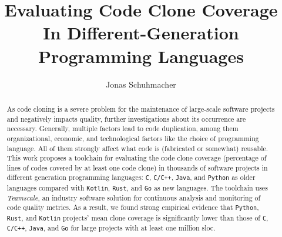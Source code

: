 \documentclass[runningheads]{llncs}
\def\teamscale{\textit{Teamscale}}
\begin{document}
%
\title{Evaluating Code Clone Coverage In Different-Generation Programming Languages}
%
%
%
\author{Jonas Schuhmacher}
%
\maketitle %
%
%
\begin{abstract}
As code cloning is a severe problem for the maintenance of large-scale software projects and negatively impacts quality, further investigations about its occurrence are necessary. Generally, multiple factors lead to code duplication, among them organizational, economic, and technological factors like the choice of programming language. All of them strongly affect what code is (fabricated or somewhat) reusable.
This work proposes a toolchain for evaluating the code clone coverage (percentage of lines of codes covered by at least one code clone) in thousands of software projects in different generation programming languages: \texttt{C}, \texttt{C/C++}, \texttt{Java}, and \texttt{Python} as older languages compared with \texttt{Kotlin}, \texttt{Rust}, and \texttt{Go} as new languages.
The toolchain uses \teamscale{}, an industry software solution for continuous analysis and monitoring of code quality metrics.
As a result, we found strong empirical evidence that \texttt{Python}, \texttt{Rust}, and \texttt{Kotlin} projects' mean clone coverage is significantly lower than those of \texttt{C}, \texttt{C/C++}, \texttt{Java}, and \texttt{Go} for large projects with at least one million \acl{sloc}.

\end{abstract}
%
%







%
%
%
%
%


%
\end{document}
